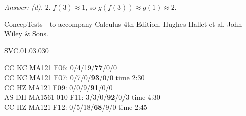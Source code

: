 {\it Answer: (d).} 2.  $f(3) \approx 1$, so $g(f(3)) \approx g(1) \approx 2$.

\medskip


\medskip
ConcepTests - to accompany Calculus 4th Edition, Hughes-Hallet et al. John Wiley \& Sons.

SVC.01.03.030


CC KC MA121 F06: 0/4/19/{\bf 77}/0/0 \\
CC KC MA121 F07: 0/7/0/{\bf 93}/0/0 time 2:30 \\
CC HZ MA121 F09: 0/0/9/{\bf91}/0/0  \\
AS DH MA1561 010 F11: 3/3/0/{\bf92}/0/3 time 4:30  \\
CC HZ MA121 F12: 0/5/18/{\bf68}/9/0 time 2:45  \\
